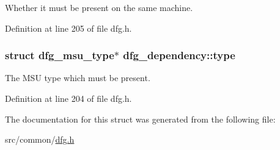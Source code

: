 Whether it must be present on the same machine. 



Definition at line 205 of file dfg.\-h.

\hypertarget{structdfg__dependency_a0aa6bde8bdcb9cbf14d8ceb86552af21}{
\subsubsection[{type}]{\setlength{\rightskip}{0pt plus 5cm}struct {\bf dfg\-\_\-msu\-\_\-type}$\ast$ dfg\-\_\-dependency\-::type}}\label{structdfg__dependency_a0aa6bde8bdcb9cbf14d8ceb86552af21}


The M\-S\-U type which must be present. 



Definition at line 204 of file dfg.\-h.



The documentation for this struct was generated from the following file\-:\begin{DoxyCompactItemize}
\item 
src/common/\hyperlink{dfg_8h}{dfg.\-h}\end{DoxyCompactItemize}
